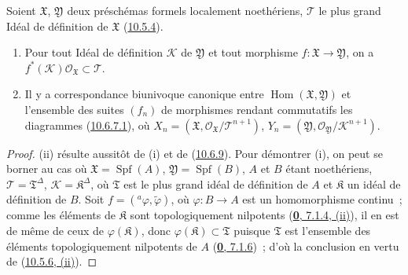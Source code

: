 \begin{corollary}[10.6.10]
\label{I.10.6.10-fr}
Soient $\mathfrak{X}$, $\mathfrak{Y}$ deux préschémas formels
localement noethériens, $\mathscr{T}$ le plus grand Idéal de définition
de $\mathfrak{X}$ \textup{(\hyperref[I.10.5.4-fr]{10.5.4})}.
\begin{enumerate}
  \item[\rm{(i)}] Pour tout Idéal de définition $\mathscr{K}$ de
  $\mathfrak{Y}$ et tout morphisme
  $f:\mathfrak{X}\to\mathfrak{Y}$, on a
  $f^*(\mathscr{K})\mathscr{O}_{\mathfrak{X}}\subset\mathscr{T}$.
  \item[\rm{(ii)}] Il y a correspondance biunivoque canonique entre
  $\operatorname{Hom}(\mathfrak{X},\mathfrak{Y})$ et l'ensemble des
  suites $(f_n)$ de morphismes rendant commutatifs les diagrammes
  \textup{(\hyperref[I.10.6.7.1-fr]{10.6.7.1})}, où
  $X_n=(\mathfrak{X},
  \mathscr{O}_{\mathfrak{X}}/\mathscr{T}^{n+1})$,
  $Y_n=(\mathfrak{Y},
  \mathscr{O}_{\mathfrak{Y}}/\mathscr{K}^{n+1})$.
\end{enumerate}
\end{corollary}

\begin{proof}
(ii) résulte aussitôt de (i) et de
(\hyperref[I.10.6.9-fr]{10.6.9}). Pour démontrer (i), on peut se borner
au cas où $\mathfrak{X}=\operatorname{Spf}(A)$,
$\mathfrak{Y}=\operatorname{Spf}(B)$, $A$ et $B$ étant noethériens,
$\mathscr{T}=\mathfrak{T}^\Delta$,
$\mathscr{K}=\mathfrak{K}^\Delta$, où $\mathfrak{T}$ est le plus grand
idéal de définition de $A$ et $\mathfrak{K}$ un idéal de définition de
$B$. Soit $f=({}^a\varphi,\widetilde{\varphi})$, où
$\varphi:B\to A$ est un homomorphisme continu~; comme les éléments de
$\mathfrak{K}$ sont topologiquement nilpotents
(\hyperref[0.7.1.4-fr]{\textbf{0}, 7.1.4, (ii)}), il en est de même de ceux de
$\varphi(\mathfrak{K})$, donc
$\varphi(\mathfrak{K})\subset\mathfrak{T}$ puisque $\mathfrak{T}$ est
l'ensemble des éléments topologiquement nilpotents de $A$
(\hyperref[0.7.1.6-fr]{\textbf{0}, 7.1.6})~; d'où la conclusion en vertu de
(\hyperref[I.10.5.6-fr]{10.5.6, (ii)}).
\end{proof}

